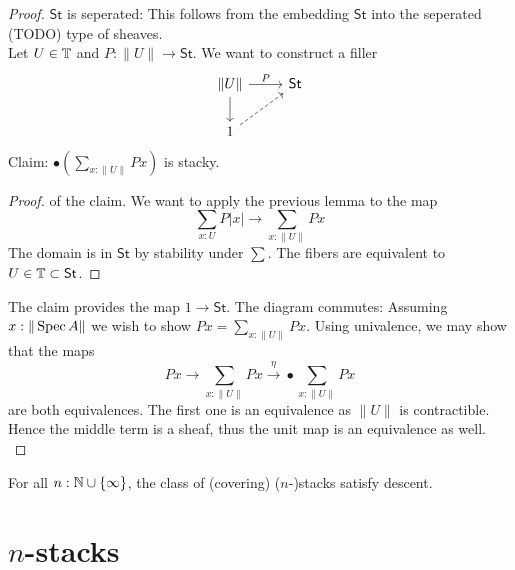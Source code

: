 \documentclass{article}
\newcommand{\St}{\mathsf{St}}
\begin{document}
\begin{proof}
	$\St$ is seperated: This follows from the embedding $\St$ into the seperated (TODO) type of sheaves. \\
	Let $U \in \mathbb{T}$ and $P : \|U\| \to \St$. We want to construct a filler 
	\[\begin{tikzcd}
		{\| U\|} & \St \\
		1
		\arrow["P", from=1-1, to=1-2]
		\arrow[from=1-1, to=2-1]
		\arrow[dashed, from=2-1, to=1-2]
	\end{tikzcd}\]
	Claim: $\bullet (\sum_{x: \|U\|} P x)$ is stacky.
	\begin{proof} of the claim. We want to apply the previous lemma to the map 
		\[\sum_{x : U} P | x | \to \sum_{x : \| U\|} P x \]
		The domain is in $\St$ by stability under $\sum$. The fibers are equivalent to $U \in \bT \subset \St$.				
	\end{proof}
    The claim provides the map $1 \to \St$. The diagram commutes: Assuming $x : \|\operatorname{Spec} A\|$ we wish to show $P x = \sum_{x: \|U\|} P x$. Using univalence, we may show that the maps 
	\[P x \to \sum_{x: \|U\|} P x \overset{\eta}{\to} \bullet \sum_{x: \|U\|} P x\]
	are both equivalences.
	The first one is an equivalence as $\|U\|$ is contractible. Hence the middle term is a sheaf, thus the unit map is an equivalence as well. \\
	
	
	
\end{proof}
\begin{corollary}
	For all $n : \mathbb{N} \cup \{\infty \}$, the class of (covering) ($n$-)stacks satisfy descent.
\end{corollary}







\section{ $n$-stacks}

        
\end{document}
